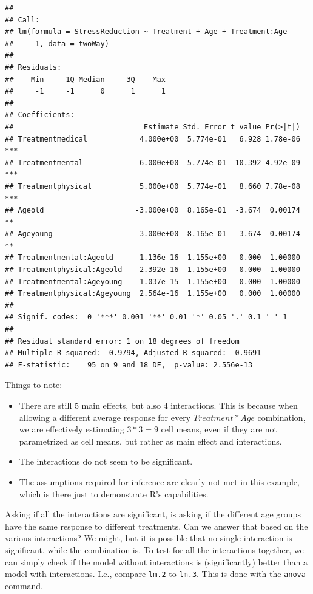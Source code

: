 \documentclass[]{book}
\providecommand{\tightlist}{%
  \setlength{\itemsep}{0pt}\setlength{\parskip}{0pt}}
\theoremstyle{definition}
\theoremstyle{definition}
\theoremstyle{definition}
\theoremstyle{remark}
\begin{document}
\begin{verbatim}
## 
## Call:
## lm(formula = StressReduction ~ Treatment + Age + Treatment:Age - 
##     1, data = twoWay)
## 
## Residuals:
##    Min     1Q Median     3Q    Max 
##     -1     -1      0      1      1 
## 
## Coefficients:
##                              Estimate Std. Error t value Pr(>|t|)    
## Treatmentmedical            4.000e+00  5.774e-01   6.928 1.78e-06 ***
## Treatmentmental             6.000e+00  5.774e-01  10.392 4.92e-09 ***
## Treatmentphysical           5.000e+00  5.774e-01   8.660 7.78e-08 ***
## Ageold                     -3.000e+00  8.165e-01  -3.674  0.00174 ** 
## Ageyoung                    3.000e+00  8.165e-01   3.674  0.00174 ** 
## Treatmentmental:Ageold      1.136e-16  1.155e+00   0.000  1.00000    
## Treatmentphysical:Ageold    2.392e-16  1.155e+00   0.000  1.00000    
## Treatmentmental:Ageyoung   -1.037e-15  1.155e+00   0.000  1.00000    
## Treatmentphysical:Ageyoung  2.564e-16  1.155e+00   0.000  1.00000    
## ---
## Signif. codes:  0 '***' 0.001 '**' 0.01 '*' 0.05 '.' 0.1 ' ' 1
## 
## Residual standard error: 1 on 18 degrees of freedom
## Multiple R-squared:  0.9794, Adjusted R-squared:  0.9691 
## F-statistic:    95 on 9 and 18 DF,  p-value: 2.556e-13
\end{verbatim}

Things to note:

\begin{itemize}
\tightlist
\item
  There are still \(5\) main effects, but also \(4\) interactions.
  This is because when allowing a different average response for every \(Treatment*Age\) combination, we are effectively estimating \(3*3=9\) cell means, even if they are not parametrized as cell means, but rather as main effect and interactions.
\item
  The interactions do not seem to be significant.
\item
  The assumptions required for inference are clearly not met in this example, which is there just to demonstrate R's capabilities.
\end{itemize}

Asking if all the interactions are significant, is asking if the different age groups have the same response to different treatments.
Can we answer that based on the various interactions?
We might, but it is possible that no single interaction is significant, while the combination is.
To test for all the interactions together, we can simply check if the model without interactions is (significantly) better than a model with interactions. I.e., compare \texttt{lm.2} to \texttt{lm.3}.
This is done with the \texttt{anova} command.
\end{document}
